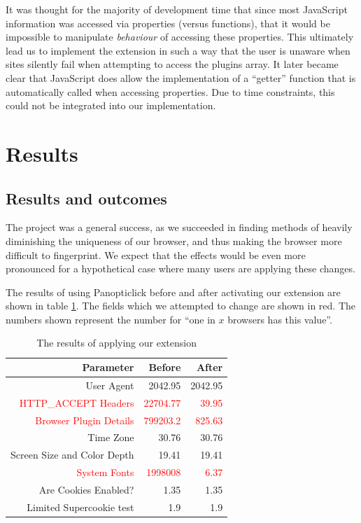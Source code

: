 \documentclass[12pt,a4paper]{article}
\begin{document}
It was thought for the majority of development time that since most JavaScript information was accessed via properties (versus functions), that it would be impossible to manipulate \textit{behaviour} of accessing these properties. This ultimately lead us to implement the extension in such a way that the user is unaware when sites silently fail when attempting to access the plugins array. It later became clear that JavaScript does allow the implementation of a ``getter'' function that is automatically called when accessing properties. Due to time constraints, this could not be integrated into our implementation.

\section{Results}
\subsection{Results and outcomes}
\label{subsec:results}
The project was a general success, as we succeeded in finding methods of heavily diminishing the uniqueness of our browser, and thus making the browser more difficult to fingerprint. We expect that the effects would be even more pronounced for a hypothetical case where many users are applying these changes.

The results of using Panopticlick before and after activating our extension are shown in table \ref{tab:resultTable}. The fields which we attempted to change are shown in red. The numbers shown represent the number for ``one in $x$ browsers has this value''.

\begin{table}[ht]
	\centering
	\begin{tabular}{|r|r|r|}
		\hline
		\textbf{Parameter} & \textbf{Before} & \textbf{After} \\
		\hline
		User Agent & 2042.95 & 2042.95 \\
		\textcolor{red}{HTTP\_ACCEPT Headers} & \textcolor{red}{22704.77} & \textcolor{red}{39.95} \\
		\textcolor{red}{Browser Plugin Details} & \textcolor{red}{799203.2} & \textcolor{red}{825.63} \\
		Time Zone & 30.76 & 30.76 \\
		Screen Size and Color Depth & 19.41 & 19.41 \\
		\textcolor{red}{System Fonts} & \textcolor{red}{1998008} & \textcolor{red}{6.37} \\
		Are Cookies Enabled? & 1.35 & 1.35 \\
		Limited Supercookie test & 1.9 & 1.9 \\
		\hline
	\end{tabular}
	\caption{The results of applying our extension}
 	\label{tab:resultTable}
\end{table}
\end{document}
